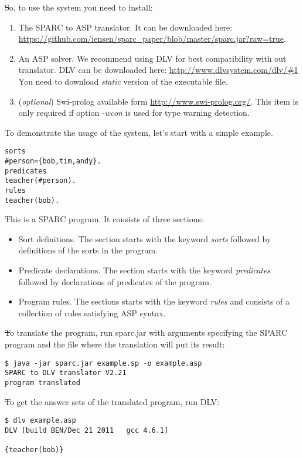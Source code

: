 \documentclass[12pt, letterpaper]{article}
\begin{document}
\st So, to use the system you need to install:
\begin{enumerate}
\item The SPARC to ASP translator. It can be downloaded here: \url{https://github.com/iensen/sparc_paper/blob/master/sparc.jar?raw=true}.
\item An ASP solver. We recommend using DLV for best compatibility with out translator. DLV can be downloaded here:
 \url{http://www.dlvsystem.com/dlv/#1} You need to download \textit{static} version of the executable file.
\item (\textit{optional}) Swi-prolog available form \url{http://www.swi-prolog.org/}. This item is only required if option \textit{-wcon} is used for type warning detection.


\end{enumerate}
To demonstrate the usage of the system, let's start with a simple example.
\begin{verbatim}
sorts
#person={bob,tim,andy}.
predicates
teacher(#person).
rules
teacher(bob).
\end{verbatim}

\st This is a SPARC program. It consists of three sections:
\begin{itemize}
 \item Sort definitions. The section starts with the keyword \textit{sorts} followed by definitions of the sorts in the program.
 \item Predicate declarations. The section starts with the keyword \textit{predicates} followed by declarations of predicates of the program.
 \item Program rules. The sections starts with the keyword \textit{rules}  and consists of a collection of rules satisfying ASP syntax.
\end{itemize}

\st To translate the program, run sparc.jar with arguments specifying the SPARC program and the file where the translation will put its result:
\begin{verbatim}
$ java -jar sparc.jar example.sp -o example.asp
SPARC to DLV translator V2.21
program translated
\end{verbatim}

\st To get the answer sets of the translated program, run DLV:

\begin{verbatim}
$ dlv example.asp
DLV [build BEN/Dec 21 2011   gcc 4.6.1]

{teacher(bob)}
\end{verbatim}
\end{document}
